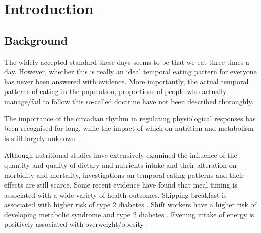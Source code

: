 
\chapter{Introduction} %

\label{Chapter 1} %


\newcommand{\keyword}[1]{\textbf{#1}}
\newcommand{\tabhead}[1]{\textbf{#1}}
\newcommand{\code}[1]{\texttt{#1}}
\newcommand{\file}[1]{\texttt{\bfseries#1}}
\newcommand{\option}[1]{\texttt{\itshape#1}}


\section{Background}\vspace{-0.3cm}

The widely accepted standard these days seems to be that we eat three times a day. However, whether this is really an ideal temporal eating pattern for everyone has never been answered with evidence. More importantly, the actual temporal patterns of eating in the population, proportions of people who actually manage/fail to follow this so-called doctrine have not been described thoroughly. 

The importance of the circadian rhythm in regulating physiological responses has been recognised for long, while the impact of which on nutrition and metabolism is still largely unknown \parencite{johnston2014physiological, asher2015time}. 

Although nutritional studies have extensively examined the influence of the quantity and quality of dietary and nutrients intake and their alteration on morbidity and mortality, investigations on temporal eating patterns and their effects are still scarce. Some recent evidence have found that meal timing is associated with a wide variety of health outcomes. Skipping breakfast is associated with higher risk of type 2 diabetes \parencite{uemura2015breakfast}. Shift workers have a higher risk of developing metabolic syndrome \parencite{de2009rotating} and type 2 diabetes \parencite{pan2011rotating}. Evening intake of energy is positively associated with overweight/obesity \parencite{almoosawi2016chrono}. 

